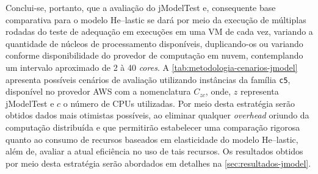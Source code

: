\documentclass[english,brazilian]{UNISINOSmonografia} %
\begin{document}
Conclui-se, portanto, que a avaliação do jModelTest e, consequente base comparativa para o modelo \textsf{He}--lastic se dará por meio da execução de múltiplas rodadas do teste de adequação em execuções em uma VM de cada vez, variando a quantidade de núcleos de processamento disponíveis, duplicando-os ou variando conforme disponibilidade do provedor de computação em nuvem, contemplando um intervalo aproximado de 2 à 40 \textit{cores}.
A \autoref{tab:metodologia-cenarios-jmodel} apresenta possíveis cenários de avaliação utilizando instâncias da família \texttt{c5}, disponível no provedor AWS com a nomenclatura $C_{zc}$, onde, $z$ representa jModelTest e $c$ o número de CPUs utilizadas.
Por meio desta estratégia serão obtidos dados mais otimistas possíveis, ao eliminar qualquer \textit{overhead} oriundo da computação distribuída e que permitirão estabelecer uma comparação rigorosa quanto ao consumo de recursos baseados em elasticidade do modelo \textsf{He}--lastic, além de, avaliar a atual eficiência no uso de tais recursos.
Os resultados obtidos por meio desta estratégia serão abordados em detalhes na \autoref{sec:resultados-jmodel}.


\end{document}
